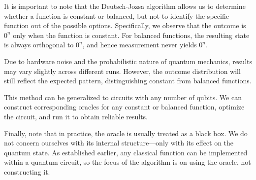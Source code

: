 It is important to note that the Deutsch-Jozsa algorithm allows us to determine whether a function is constant or balanced, but not to identify the specific function out of the possible options. Specifically, we observe that the outcome is $0^n$ only when the function is constant. For balanced functions, the resulting state is always orthogonal to $0^n$, and hence measurement never yields $0^n$.

Due to hardware noise and the probabilistic nature of quantum mechanics, results may vary slightly across different runs. However, the outcome distribution will still reflect the expected pattern, distinguishing constant from balanced functions.

This method can be generalized to circuits with any number of qubits. We can construct corresponding oracles for any constant or balanced function, optimize the circuit, and run it to obtain reliable results.

Finally, note that in practice, the oracle is usually treated as a black box. We do not concern ourselves with its internal structure—only with its effect on the quantum state. As established earlier, any classical function can be implemented within a quantum circuit, so the focus of the algorithm is on using the oracle, not constructing it.



\chapterreferences
